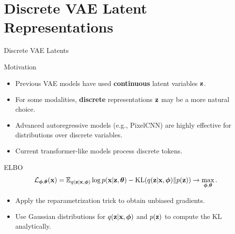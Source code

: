 \documentclass{beamer}
\begin{document}
\section{Discrete VAE Latent Representations}
\begin{frame}{Discrete VAE Latents}
	\begin{block}{Motivation}
		\begin{itemize}
			\item Previous VAE models have used \textbf{continuous} latent variables $\mathbf{z}$.
			\item For some modalities, \textbf{discrete} representations $\mathbf{z}$ may be a more natural choice.
			\item Advanced autoregressive models (e.g., PixelCNN) are highly effective for distributions over discrete variables.
			\item Current transformer-like models process discrete tokens.
		\end{itemize}
	\end{block}
	\eqpause
	\begin{block}{ELBO}
		\vspace{-0.3cm}
		\[
			\mathcal{L}_{\boldsymbol{\phi}, \boldsymbol{\theta}}(\mathbf{x})  = \mathbb{E}_{q(\mathbf{z} | \mathbf{x}, \boldsymbol{\phi})} \log p(\mathbf{x} | \mathbf{z} , \boldsymbol{\theta}) - \mathrm{KL}(q(\mathbf{z}| \mathbf{x}, \boldsymbol{\phi}) \| p(\mathbf{z})) \rightarrow \max_{\boldsymbol{\phi}, \boldsymbol{\theta}}.
		\]
		\vspace{-0.5cm}
	\end{block}
	\eqpause
	\begin{itemize}
		\item Apply the reparametrization trick to obtain unbiased gradients.
		\item Use Gaussian distributions for $q(\mathbf{z} | \mathbf{x}, \boldsymbol{\phi})$ and $p(\mathbf{z})$ to compute the KL analytically.
	\end{itemize}
\end{frame}
\end{document}
